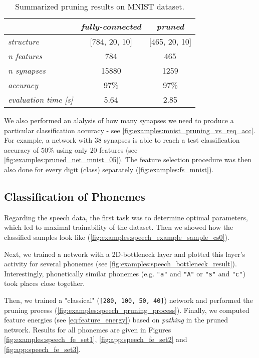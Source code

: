 \begin{table}[H]
\centering
\begin{tabular}{|l|c|c|}
\hline
                                 & \textit{fully-connected} & \textit{pruned}   \\ \hline
\textit{structure}               & {[}784, 20, 10{]}        & {[}465, 20, 10{]} \\ \hline
\textit{n features}              & 784                      & 465               \\ \hline
\textit{n synapses}              & 15880                    & 1259              \\ \hline
\textit{accuracy}                & 97\%                     & 97\%              \\ \hline
\textit{evaluation time {[}s{]}} & 5.64                     & 2.85              \\ \hline
\end{tabular}
\caption{Summarized pruning results on MNIST dataset.}
\label{tab:discussion:pruning_results_mnist}
\end{table}

We also performed an alalysis of how many synapses we need to produce a particular classification accuracy - see \cref{fig:examples:mnist_pruning_vs_req_acc}. For example, a network with $ 38 $ synapses is able to reach a test classification accuracy of $ 50\% $ using only $ 20 $ features (see \cref{fig:examples:pruned_net_mnist_05}). The feature selection procedure was then also done for every digit (class) separately (\cref{fig:examples:fs_mnist}).

\subsection*{Classification of Phonemes}
Regarding the speech data, the first task was to determine optimal parameters, which led to maximal trainability of the dataset. Then we showed how the classified samples look like (\cref{fig:examples:speech_example_sample_cs0}).

Next, we trained a network with a 2D-bottleneck layer and plotted this layer's activity for several phonemes (see \cref{fig:examples:speech_bottleneck_result}). Interestingly, phonetically similar phonemes (e.g. \texttt{"a"} and \texttt{"A"} or \texttt{"s"} and \texttt{"c"}) took places close together. 

Then, we trained a "classical" (\texttt{[280, 100, 50, 40]}) network and performed the pruning process (\cref{fig:examples:speech_pruning_process}). Finally, we computed feature energies (see \cref{eq:feature_energy}) based on \textit{pathing} in the pruned network. Results for all phonemes are given in Figures \ref{fig:examples:speech_fe_set1}, \ref{fig:app:speech_fe_set2} and \ref{fig:app:speech_fe_set3}.

